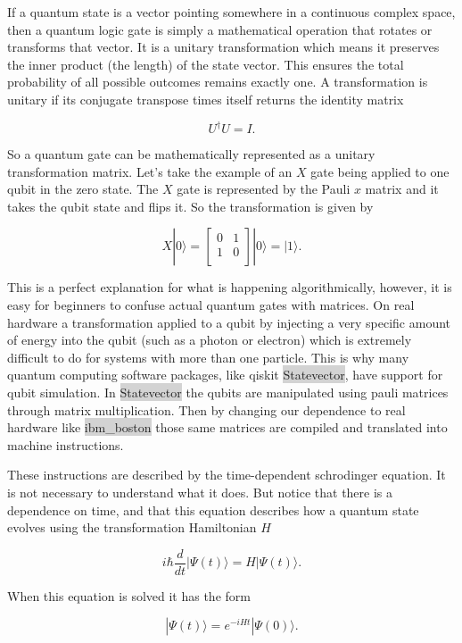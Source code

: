 \documentclass[12pt, oneside]{book}
\begin{document}
If a quantum state is a vector pointing somewhere in a continuous complex space, then a quantum logic gate is simply a mathematical 
operation that rotates or transforms that vector. It is a unitary transformation which means it preserves the inner
product (the length) of the state vector. This ensures the total probability of all possible outcomes remains exactly one. 
A transformation is unitary if its conjugate transpose times itself returns the identity matrix 

$$
U^{\dagger} U = I.
$$

So a quantum gate can be mathematically represented as a unitary transformation matrix. Let's take the example of an $X$ gate
being applied to one qubit in the zero state. The $X$ gate is represented by the Pauli $x$ matrix and it takes the qubit 
state and flips it. So the transformation is given by 

$$
X |0 \rangle = \begin{bmatrix} 0 & 1 \\ 1 & 0 \\ \end{bmatrix} |0 \rangle = |1 \rangle. 
$$

This is a perfect explanation for what is happening algorithmically, however, it is easy for beginners to confuse actual quantum 
gates with matrices. On real hardware a transformation applied to a qubit by injecting a very specific amount of energy into the 
qubit (such as a photon or electron) which is extremely difficult to do for systems with more than 
one particle. This is why many quantum computing software packages, like qiskit \colorbox{lightgray}{Statevector}, have support for 
qubit simulation. In \colorbox{lightgray}{Statevector} the qubits are manipulated using pauli matrices through 
matrix multiplication. Then by changing our dependence to real hardware like \colorbox{lightgray}{ibm\_boston} those 
same matrices are compiled and translated into machine instructions. 

These instructions are described by the time-dependent schrodinger equation. It is not necessary to understand what it does. 
But notice that there is a dependence on time, and that this equation describes how a quantum state evolves using the 
transformation Hamiltonian $H$ 

$$
i \hbar \frac{d}{d t}|\Psi(t)\rangle=H|\Psi(t)\rangle.
$$

When this equation is solved it has the form

$$
|\Psi(t)\rangle=e^{-i H t}|\Psi(0)\rangle.
$$
\end{document}
